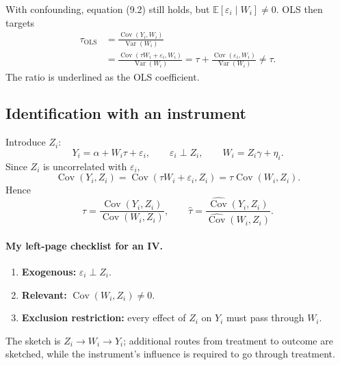 With confounding, equation (9.2) still holds, but $\mathbb E[\varepsilon_i\mid W_i]\ne0$. OLS then targets
\begin{align*}
 \tau_{\mathrm{OLS}}
 &=\frac{\operatorname{Cov}(Y_i,W_i)}{\operatorname{Var}(W_i)}\\
 &=\frac{\operatorname{Cov}(\tau W_i+\varepsilon_i,W_i)}{\operatorname{Var}(W_i)}
 =\tau+\frac{\operatorname{Cov}(\varepsilon_i,W_i)}{\operatorname{Var}(W_i)}
 \ne\tau.
\end{align*}
The ratio is underlined as the OLS coefficient.

\subsection{Identification with an instrument}
Introduce $Z_i$:
\[
 Y_i=\alpha+W_i\tau+\varepsilon_i,\qquad\varepsilon_i\perp Z_i,
 \qquad W_i=Z_i\gamma+\eta_i.\tag{9.4}
\]
Since $Z_i$ is uncorrelated with $\varepsilon_i$,
\[
 \operatorname{Cov}(Y_i,Z_i)
 =\operatorname{Cov}(\tau W_i+\varepsilon_i,Z_i)
 =\tau\operatorname{Cov}(W_i,Z_i).
\]
Hence
\[
 \tau=\frac{\operatorname{Cov}(Y_i,Z_i)}{\operatorname{Cov}(W_i,Z_i)},
 \qquad
 \widehat\tau=\frac{\widehat{\operatorname{Cov}}(Y_i,Z_i)}
 {\widehat{\operatorname{Cov}}(W_i,Z_i)}.
\]

\paragraph{My left-page checklist for an IV.}
\begin{enumerate}
 \item \textbf{Exogenous:} $\varepsilon_i\perp Z_i$.
 \item \textbf{Relevant:} $\operatorname{Cov}(W_i,Z_i)\ne0$.
 \item \textbf{Exclusion restriction:} every effect of $Z_i$ on $Y_i$ must pass through $W_i$.
\end{enumerate}
The sketch is $Z_i\to W_i\to Y_i$; additional routes from treatment to outcome are sketched, while the instrument's influence is required to go through treatment.

